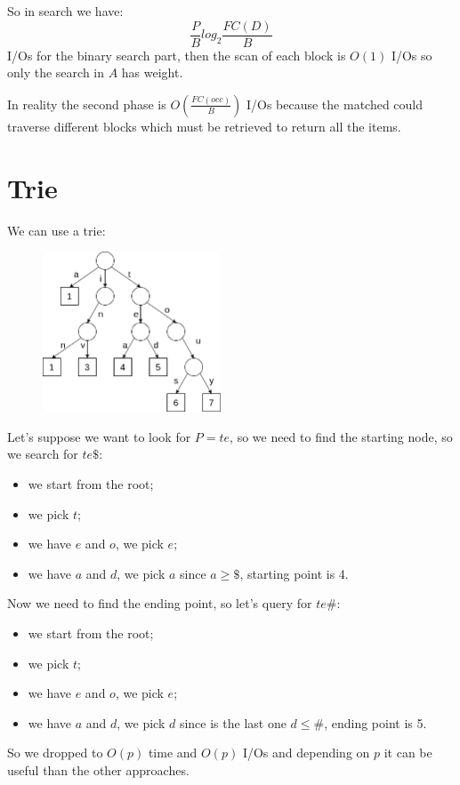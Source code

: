 So in search we have:
$$
    \frac{P}{B}log_2 \frac{FC(D)}{B}
$$
I/Os for the binary search part, then the scan of each block is $O(1)$ I/Os so only the search in $A$ has weight.

In reality the second phase is $O \left( \frac{FC(occ)}{B} \right)$ I/Os because the matched could traverse different blocks which must be retrieved to return all the items.

\section{Trie}
We can use a trie:
\begin{figure}[H]
    \centering
    \includegraphics[width=200px]{images/8_Prefix_search/prefix_trie.png}
\end{figure}

Let's suppose we want to look for $P=te$, so we need to find the starting node, so we search for $te\$$:
\begin{itemize}
    \item we start from the root;
    \item we pick $t$;
    \item we have $e$ and $o$, we pick $e$;
    \item we have $a$ and $d$, we pick $a$ since $a \geq \$$, starting point is 4.
\end{itemize}
Now we need to find the ending point, so let's query for $te\#$:
\begin{itemize}
    \item we start from the root;
    \item we pick $t$;
    \item we have $e$ and $o$, we pick $e$;
    \item we have $a$ and $d$, we pick $d$ since is the last one $d \leq \#$, ending point is 5.
\end{itemize}
So we dropped to $O(p)$ time and $O(p)$ I/Os and depending on $p$ it can be useful than the other approaches.

